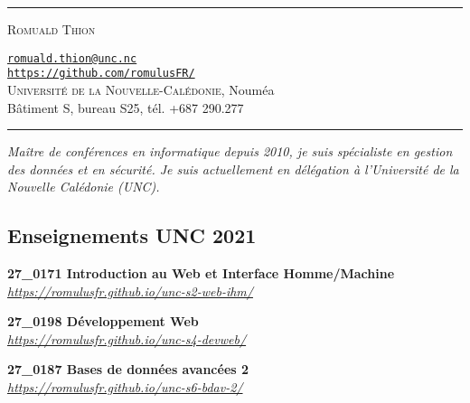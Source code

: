 \documentclass[12pt,a4paper]{article}
\newcommand{\hr}{\textcolor{gris80}{\rule{\linewidth}{0.5pt}}}
\newcommand{\activite}[1]{\textbf{#1}\xspace}
\newcommand{\comment}[1]{\textsl{#1}\xspace}
\newcommand{\UNC}{\textsc{Universit{\'e} de la Nouvelle-Calédonie}\xspace}
\begin{document}
\hr

\vspace{0.5em}

\begin{minipage}[c]{0.5\textwidth}
  \begin{center}
    {\LARGE\textsc{Romuald Thion}} %
  \end{center}
\end{minipage}
\begin{minipage}[c]{0.5\textwidth}
  \begin{center}
    \href{mailto:romuald.thion@unc.nc}{\nolinkurl{romuald.thion@unc.nc}}\\
    \href{https://github.com/romulusFR/}{\nolinkurl{https://github.com/romulusFR/}}\\
    \UNC, Nouméa\\
    Bâtiment S, bureau S25, tél. +687 290.277
  \end{center}
\end{minipage}

\vspace{0.5em}

\hr

\begin{center}
  \emph{Maître de conférences en informatique depuis 2010, je suis spécialiste en gestion des données et en sécurité. Je suis actuellement en délégation à l'Université de la Nouvelle Calédonie (UNC).}
\end{center}

\subsection*{Enseignements UNC 2021} 
     \activite{27\_0171 Introduction au Web et Interface Homme/Machine}\\
     \comment{\url{https://romulusfr.github.io/unc-s2-web-ihm/}} 

     \activite{27\_0198 Développement Web}\\
     \comment{\url{https://romulusfr.github.io/unc-s4-devweb/}} 

     \activite{27\_0187 Bases de données avancées 2}\\
     \comment{\url{https://romulusfr.github.io/unc-s6-bdav-2/}}

\end{document}
